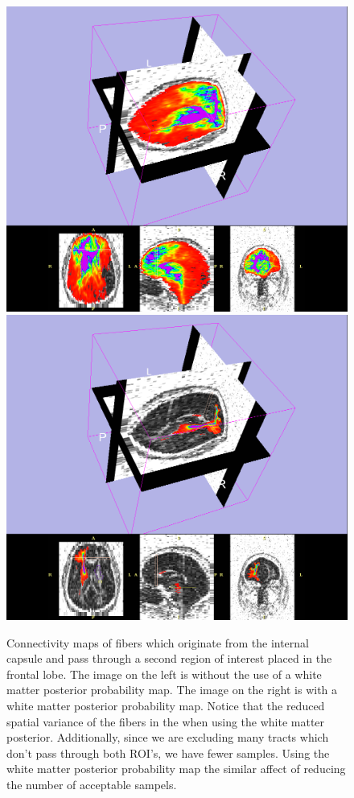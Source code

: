 \begin{figure} \label{fig:twocmaps}
	\includegraphics[width=0.5\linewidth]{slicer-0021}
	\includegraphics[width=0.5\linewidth]{slicer-0019}
	\caption{Connectivity maps of fibers which originate from the internal capsule and pass through a second region of interest placed in the frontal lobe.  The image on the left is without the use of a white matter posterior probability map.  The image on the right is with a white matter posterior probability map.  Notice that the reduced spatial variance of the fibers in the when using the white matter posterior.  Additionally, since we are excluding many tracts which don't pass through both ROI's, we have fewer samples.  Using the white matter posterior probability map the similar affect of reducing the number of acceptable sampels.}
\end{figure}

